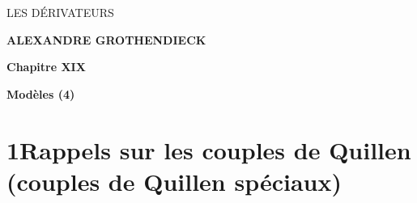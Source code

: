 \dgrchunkbegin


\begin{center}
{\Large\textsf{LES DÉRIVATEURS}}

\bigskip

\textbf{ALEXANDRE GROTHENDIECK}

\bigskip\bigskip

\textbf{Chapitre XIX}

\medskip

\textbf{Modèles (4)}
\end{center}

\newpage



\newpage



\section*{1\quad Rappels sur les couples de Quillen (couples de Quillen spéciaux)}


